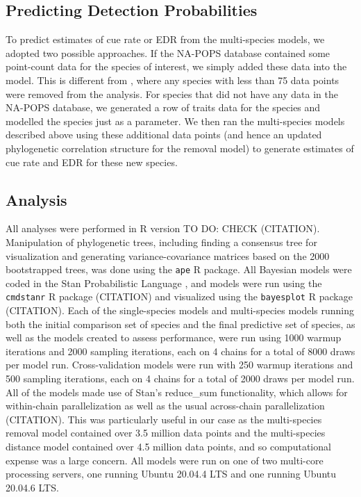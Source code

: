 \documentclass[12pt]{article}
\begin{document}
\subsection{Predicting Detection Probabilities}
\par To predict estimates of cue rate or EDR from the multi-species models, we adopted two possible approaches.
If the NA-POPS database contained some point-count data for the species of interest, we simply added these data into the model.
This is different from \citet{edwards_point_2023, solymos_calibrating_2013, solymos_evaluating_2018}, where any species with less than 75 data points were removed from the analysis.
For species that did not have any data in the NA-POPS database, we generated a row of traits data for the species and modelled the species just as a parameter.
We then ran the multi-species models described above using these additional data points (and hence an updated phylogenetic correlation structure for the removal model) to generate estimates of cue rate and EDR for these new species.

\subsection{Analysis}
\par All analyses were performed in R version TO DO: CHECK (CITATION).
Manipulation of phylogenetic trees, including finding a consensus tree for visualization and generating variance-covariance matrices based on the 2000 bootstrapped trees, was done using the \texttt{ape} R package.
All Bayesian models were coded in the Stan Probabilistic Language \cite{stan_development_team_stan_2019}, and models were run using the \texttt{cmdstanr} R package (CITATION) and visualized using the \texttt{bayesplot} R package (CITATION).
Each of the single-species models and multi-species models running both the initial comparison set of species and the final predictive set of species, as well as the models created to assess performance, were run using 1000 warmup iterations and 2000 sampling iterations, each on 4 chains for a total of 8000 draws per model run.
Cross-validation models were run with 250 warmup iterations and 500 sampling iterations, each on 4 chains for a total of 2000 draws per model run.
All of the models made use of Stan's reduce\_sum functionality, which allows for within-chain parallelization as well as the usual across-chain parallelization (CITATION).
This was particularly useful in our case as the multi-species removal model contained over 3.5 million data points and the multi-species distance model contained over 4.5 million data points, and so computational expense was a large concern.
All models were run on one of two multi-core processing servers, one running Ubuntu 20.04.4 LTS and one running Ubuntu 20.04.6 LTS.
\end{document}
